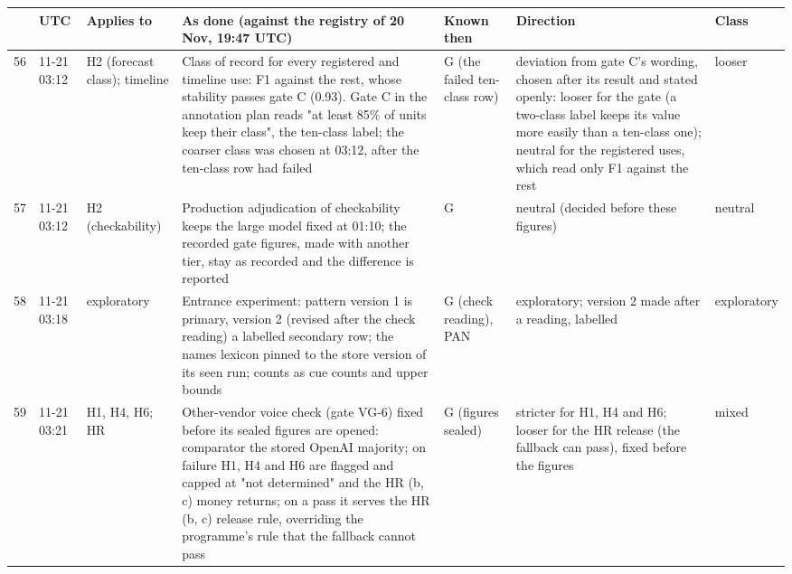 {\tiny\setlength{\tabcolsep}{2pt}
\begin{tabular}{@{}rp{}p{}p{}p{}p{}l@{}}
\toprule
 & UTC & Applies to & As done (against the registry of 20 Nov, 19:47 UTC) & Known then & Direction & Class \\
\midrule
56 & 11-21 03:12 & H2 (forecast class); timeline & Class of record for every registered and timeline use: F1 against the rest, whose stability passes gate C (0.93). Gate C in the annotation plan reads "at least 85\% of units keep their class", the ten-class label; the coarser class was chosen at 03:12, after the ten-class row had failed & G (the failed ten-class row) & deviation from gate C's wording, chosen after its result and stated openly: looser for the gate (a two-class label keeps its value more easily than a ten-class one); neutral for the registered uses, which read only F1 against the rest & looser \\
57 & 11-21 03:12 & H2 (checkability) & Production adjudication of checkability keeps the large model fixed at 01:10; the recorded gate figures, made with another tier, stay as recorded and the difference is reported & G & neutral (decided before these figures) & neutral \\
58 & 11-21 03:18 & exploratory & Entrance experiment: pattern version 1 is primary, version 2 (revised after the check reading) a labelled secondary row; the names lexicon pinned to the store version of its seen run; counts as cue counts and upper bounds & G (check reading), PAN & exploratory; version 2 made after a reading, labelled & exploratory \\
59 & 11-21 03:21 & H1, H4, H6; HR & Other-vendor voice check (gate VG-6) fixed before its sealed figures are opened: comparator the stored OpenAI majority; on failure H1, H4 and H6 are flagged and capped at "not determined" and the HR (b, c) money returns; on a pass it serves the HR (b, c) release rule, overriding the programme's rule that the fallback cannot pass & G (figures sealed) & stricter for H1, H4 and H6; looser for the HR release (the fallback can pass), fixed before the figures & mixed \\

\end{tabular}}
